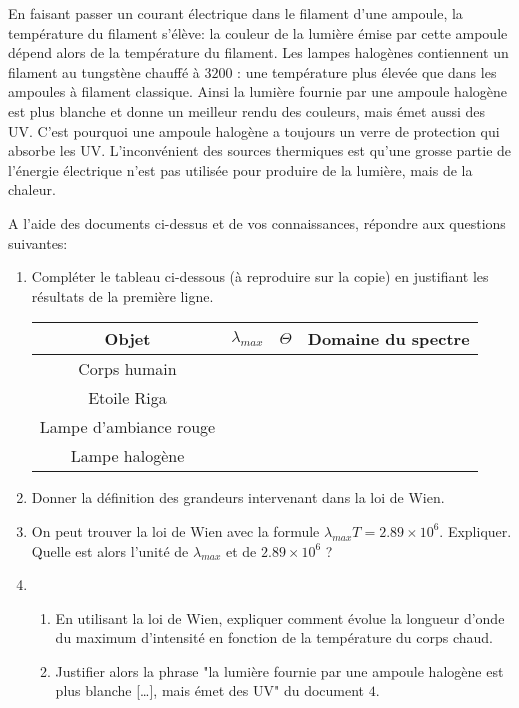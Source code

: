 En faisant passer un courant électrique dans le filament d'une ampoule, la température du filament s'élève: la couleur de la lumière émise par cette ampoule dépend alors de la température du filament.\newline
Les lampes halogènes contiennent un filament au tungstène chauffé à $3200$ \kelvin : une température plus élevée que dans les ampoules à filament classique. Ainsi la lumière fournie par une ampoule halogène est plus blanche et donne un meilleur rendu des couleurs, mais émet aussi des UV. C'est pourquoi une ampoule
halogène a toujours un verre de protection qui absorbe les UV.\newline
L'inconvénient des sources thermiques est qu'une grosse partie de l'énergie électrique n'est pas utilisée
pour produire de la lumière, mais de la chaleur.


\newpage

A l'aide des documents ci-dessus et de vos connaissances, répondre aux questions suivantes:

\begin{enumerate}
\item Compléter le tableau ci-dessous (à reproduire sur la copie) en justifiant les résultats de la première ligne.

\begin{center}
\begin{tabular}{|c|c|c|c|}
\hline
Objet & $\lambda_{max}$ & $\Theta$ & Domaine du spectre \\
\hline
Corps humain &      &       &       \\
\hline
Etoile Riga &       &       &       \\
\hline
Lampe d'ambiance rouge  &       &       &   \\
\hline
Lampe halogène  &       &       &       \\
\hline
\end{tabular}
\end{center}

\item Donner la définition des grandeurs intervenant dans la loi de Wien.

\item On peut trouver la loi de Wien avec la formule $\lambda_{max} T = 2.89 \times 10^{6}$. Expliquer. Quelle est alors l'unité de $\lambda_{max}$ et de $2.89 \times 10^{6}$ ?

\item \begin{enumerate}[label=(\alph*)]
\item En utilisant la loi de Wien, expliquer comment évolue la longueur d'onde du maximum d'intensité en fonction de la température du corps chaud.
\item Justifier alors la phrase "la lumière fournie par une ampoule halogène est plus blanche […], mais émet
des UV" du document $4$.
\end{enumerate}

\end{enumerate}

\vspace{0.3cm}